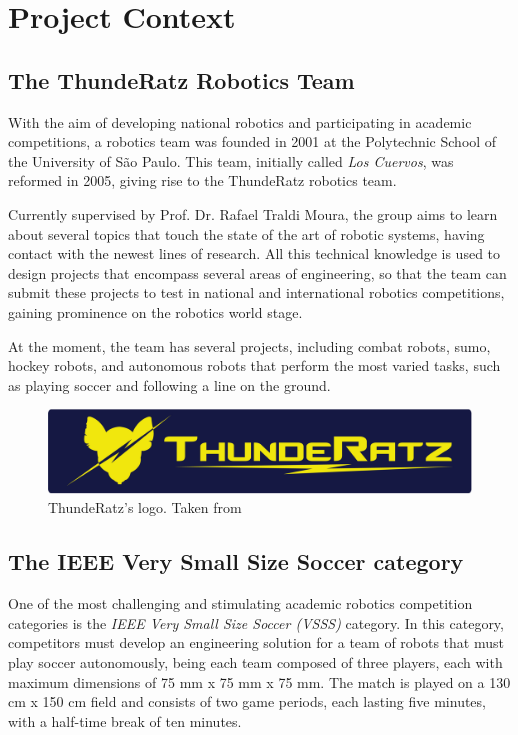 \section{Project Context}

\subsection{The ThundeRatz Robotics Team}

With the aim of developing national robotics and participating in academic competitions, a robotics team was founded in 2001 at the Polytechnic School of the University of São Paulo. This team, initially called \textit{Los Cuervos}, was reformed in 2005, giving rise to the ThundeRatz \cite{ThundeRatz} robotics team.

Currently supervised by Prof. Dr. Rafael Traldi Moura, the group aims to learn about several topics that touch the state of the art of robotic systems, having contact with the newest lines of research. All this technical knowledge is used to design projects that encompass several areas of engineering, so that the team can submit these projects to test in national and international robotics competitions, gaining prominence on the robotics world stage.

At the moment, the team has several projects, including combat robots, sumo, hockey robots, and autonomous robots that perform the most varied tasks, such as playing soccer and following a line on the ground.

\begin{figure}[!h]
    \centering
    \includegraphics[width=.6\linewidth]{chapters/introduction/images/ThundeRatz Logo.png}
    \caption{ThundeRatz's logo. Taken from \cite{ThundeRatz}}
\end{figure}

\subsection{The IEEE Very Small Size Soccer category}

One of the most challenging and stimulating academic robotics competition categories is the \textit{IEEE Very Small Size Soccer (VSSS)} category. In this category, competitors must develop an engineering solution for a team of robots that must play soccer autonomously, being each team composed of three players, each with maximum dimensions of 75 mm x 75 mm x 75 mm. The match is played on a 130 cm x 150 cm field and consists of two game periods, each lasting five minutes, with a half-time break of ten minutes.

